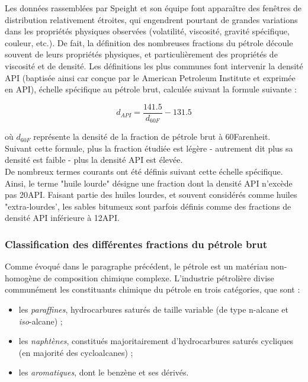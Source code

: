 Les données rassemblées par Speight et son équipe font apparaître des fenêtres de distribution relativement étroites, qui engendrent pourtant de grandes variations dans les propriétés physiques observées (volatilité, viscosité, gravité spécifique, couleur, etc.). De fait, la définition des nombreuses fractions du pétrole découle souvent de leurs propriétés physiques, et particulièrement des propriétés de viscosité et de densité. Les définitions les plus communes font intervenir la densité API (baptisée ainsi car conçue par le \og American Petroleum Institute \fg{} et exprimée en \degre API), échelle spécifique au pétrole brut, calculée suivant la formule suivante : 

\begin{equation}
d_{API}=\dfrac{141.5}{d_{60F}}-131.5
\end{equation}

où $d_{60F}$ représente la densité de la fraction de pétrole brut à 60\degre Farenheit.\\ 

Suivant cette formule, plus la fraction étudiée est légère - autrement dit plus sa densité est faible - plus la densité API est élevée.\\ 

De nombreux termes courants ont été définis suivant cette échelle spécifique. Ainsi, le terme "huile lourde" désigne une fraction dont la densité API n'excède pas 20\degre API. Faisant partie des huiles lourdes, et souvent considérés comme huiles "extra-lourdes', les sables bitumeux sont parfois définis comme des fractions de densité API inférieure à 12\degre API. 

\subsubsection{Classification des différentes fractions du pétrole brut}

Comme évoqué dans le paragraphe précédent, le pétrole est un matériau non-homogène de composition chimique complexe. L'industrie pétrolière divise communément les constituants chimique du pétrole en trois catégories, que sont : 

\begin{itemize}
	\item les \textit{paraffines}, hydrocarbures saturés de taille variable (de type n-alcane et \textit{iso}-alcane) ;
	\item les \textit{naphtènes}, constitués majoritairement d'hydrocarbures saturés cycliques (en majorité des cycloalcanes) ;
	\item les \textit{aromatiques}, dont le benzène et ses dérivés.
\end{itemize} 

